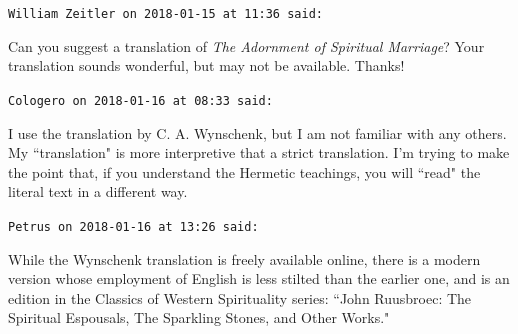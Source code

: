 \begin{footnotesize}
\begin{sffamily}
\hfill

\texttt{William Zeitler on 2018-01-15 at 11:36 said: }

Can you suggest a translation of \textit{The Adornment of Spiritual Marriage}? Your translation sounds wonderful, but may not be available. Thanks!


\hfill

\texttt{Cologero on 2018-01-16 at 08:33 said: }

I use the translation by C. A. Wynschenk, but I am not familiar with any others. My ``translation" is more interpretive that a strict translation. I'm trying to make the point that, if you understand the Hermetic teachings, you will ``read" the literal text in a different way.


\hfill

\texttt{Petrus on 2018-01-16 at 13:26 said: }

While the Wynschenk translation is freely available online, there is a modern version whose employment of English is less stilted than the earlier one, and is an edition in the Classics of Western Spirituality series: ``John Ruusbroec: The Spiritual Espousals, The Sparkling Stones, and Other Works."


\end{sffamily}\end{footnotesize}
